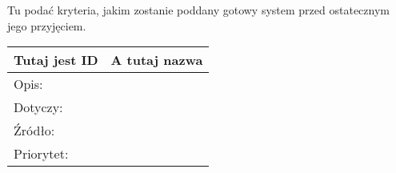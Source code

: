 \documentclass[a4paper,10pt]{article}
\begin{document}
Tu podać kryteria, jakim zostanie poddany gotowy system przed ostatecznym jego przyjęciem.


\begin{tabular}{|p{3cm}|p{9cm}|} \hline

Tutaj jest ID & A tutaj nazwa \\ \hline
Opis: &  \\ \hline
Dotyczy: &  \\ \hline
Źródło: &  \\ \hline
Priorytet: &  \\ \hline

\end{tabular}



\clearpage
{}
{}

\end{document}
